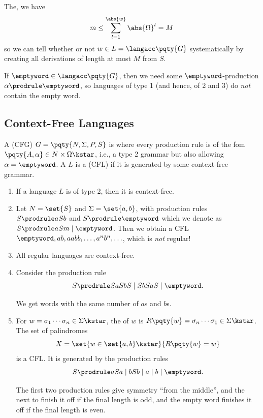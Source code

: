 The, we have
\[
    m \leq \sum_{l = 1}^{\abs{w}} \abs{\Omega}^l = M
\]
so we can tell whether or not \(w \in L = \langacc\pqty{G}\) systematically by creating all derivations of length at most \(M\) from \(S\).

If \(\emptyword \in \langacc\pqty{G}\), then we need some \(\emptyword\)-production \(\alpha \prodrule \emptyword\), so languages of type 1 (and hence, of 2 and 3) do \emph{not} contain the empty word.

\subsection{Context-Free Languages}

\begin{definition}
    A  (CFG) \(G = \pqty{N, \Sigma, P, S}\) is where every production rule is of the fom \(\pqty{A, \alpha} \in N \times \Omega\kstar\), i.e., a type 2 grammar but also allowing \(\alpha = \emptyword\). A  \(L\) is a  (CFL) if it is generated by some context-free grammar.
\end{definition}

\begin{examples}
    \begin{enumerate}[label=(\roman*)]
        \item If a language \(L\) is of type 2, then it is context-free.
        \item Let \(N = \set{S}\) and \(\Sigma = \set{a, b}\), with production rules \(S \prodrule aSb\) and \(S \prodrule \emptyword\) which we denote as \(S \prodrule aSm \mid \emptyword\). Then we obtain a CFL \(\emptyword, ab, aabb, \ldots, a^n b^n, \ldots\), which is \emph{not} regular!
        \item All regular languages are context-free.
        \item Consider the production rule
        \[
            S \prodrule SaSbS \mid SbSaS \mid \emptyword.
        \]

        We get words with the same number of \(a\)s and \(b\)s.
        \item For \(w = \sigma_1 \cdots \sigma_n \in \Sigma\kstar\), the  of \(w\) is \(R\pqty{w} = \sigma_n \cdots \sigma_1 \in \Sigma\kstar\). The set of palindromes
        \[
            X = \set{w \in \set{a, b}\kstar}{R\pqty{w} = w}
        \]
        is a CFL. It is generated by the production rules
        \[
            S \prodrule aSa \mid bSb \mid a \mid b \mid \emptyword.
        \]

        The first two production rules give symmetry ``from the middle'', and the next to finish it off if the final length is odd, and the empty word finishes it off if the final length is even.
    \end{enumerate}
\end{examples}

